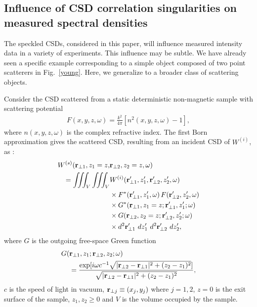 \documentclass[%
 reprint,
 amsmath,amssymb,
 aps,
]{revtex4-1}
\begin{document}
\subsection{Influence of CSD correlation singularities on measured spectral densities}\label{subsec:Discussion-part-1}

The speckled CSDs, considered in this paper, will influence measured intensity data in a variety of experiments.  This influence may be subtle.  We have already seen a specific example corresponding to a simple object composed of two point scatterers in Fig.~\ref{young}.  Here, we generalize to a broader class of scattering objects.

Consider the CSD scattered from a static deterministic non-magnetic sample with scattering potential \cite{Wolf1969,wolf_thin_book}
\begin{equation}
\begin{aligned}
\label{eq:ScatteringPotential}
F(x,y,z,\omega)=\frac{k^2}{4\pi}[n^2(x,y,z,\omega)-1],
\end{aligned}
\end{equation}
where $n(x,y,z,\omega)$ is the complex refractive index. The first Born approximation gives the scattered CSD, resulting from an incident CSD of $W^{(i)}$, as  \cite{wolf_thin_book}:
\begin{equation}
\begin{aligned}
W^{(s)} ({\bf r}_{\perp 1}, z_1=z, & {\bf r}_{\perp 2},z_2=z,\omega) \\  = \iiint_V \iiint_V &  W^{(i)}({\bf r}_{\perp 1}',z_1',{\bf r}_{\perp 2}',z_2',\omega)
\\ &\times F^*({\bf r}_{\perp 1}',z_1',\omega) \, F({\bf r}_{\perp 2}',z_2',\omega) \\ &\times G^*({\bf r}_{\perp 1},z_1=z;{\bf r}_{\perp 1}',z'_1;\omega) \\ &\times G({\bf r}_{\perp 2},z_2=z;{\bf r}_{\perp 2}',z'_2;\omega) \\ &\times d^2{\bf r}_{\perp 1}'~dz'_1~d^2{\bf r}_{\perp 2}'~dz'_2,
\label{eq:CSDScatteringFirstBornApproximation}
\end{aligned}
\end{equation}
where $G$ is the outgoing free-space Green function
\begin{equation}
\begin{aligned}
G( & {\bf r}_{\perp 1},z_1; {\bf r}_{\perp 2},z_2;\omega) \\ &=\frac{\exp[i \omega c^{-1}\sqrt{ | {\bf r}_{\perp 2}-{\bf r}_{\perp 1}|^2+(z_2-z_1)^2}]}{\sqrt{| {\bf r}_{\perp 2}-{\bf r}_{\perp 1}|^2+(z_2-z_1)^2}},
\end{aligned}
\end{equation}
$c$ is the speed of light in vacuum, ${\bf r}_{\perp j}\equiv(x_j,y_j)$ where $j=1,2$, $z=0$ is the exit surface of the sample,  $z_1,z_2\ge 0$ and $V$ is the volume occupied by the sample.
\end{document}
